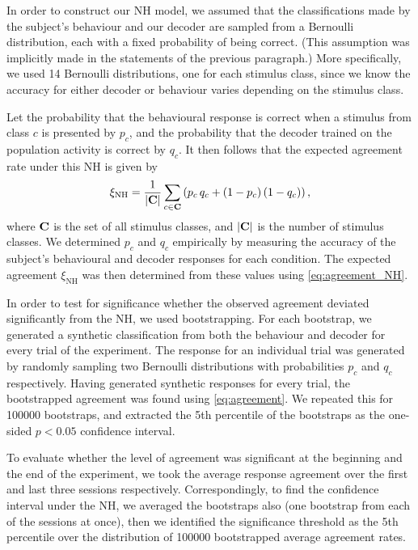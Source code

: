 In order to construct our \ac{NH} model, we assumed that the classifications made by the subject's behaviour and our decoder are sampled from a Bernoulli distribution, each with a fixed probability of being correct.
(This assumption was implicitly made in the statements of the previous paragraph.)
More specifically, we used \num{14} Bernoulli distributions, one for each stimulus class, since we know the accuracy for either decoder or behaviour varies depending on the stimulus class.

Let the probability that the behavioural response is correct when a stimulus from class $c$ is presented by $p_c$, and the probability that the decoder trained on the population activity is correct by $q_c$.
It then follows that the expected agreement rate under this \acf{NH} is given by
\begin{equation}
\label{eq:agreement_NH}
\xi_\text{NH} = \frac{1}{|\mathbf{C}|} \sum_{c \in \mathbf{C}} \left( p_c \, q_c + (1 - p_c) \, (1 - q_c) \right)
,\end{equation}
where $\mathbf{C}$ is the set of all stimulus classes, and $|\mathbf{C}|$ is the number of stimulus classes.
We determined $p_c$ and $q_c$ empirically by measuring the accuracy of the subject's behavioural and decoder responses for each condition.
The expected agreement $\xi_\text{NH}$ was then determined from these values using \autoref{eq:agreement_NH}.

In order to test for significance whether the observed agreement deviated significantly from the \ac{NH}, we used bootstrapping.
For each bootstrap, we generated a synthetic classification from both the behaviour and decoder for every trial of the experiment.
The response for an individual trial was generated by randomly sampling two Bernoulli distributions with probabilities $p_c$ and $q_c$ respectively.
Having generated synthetic responses for every trial, the bootstrapped agreement was found using \autoref{eq:agreement}.
We repeated this for \num{100000} bootstraps, and extracted the 5th percentile of the bootstraps as the one-sided $p < 0.05$ confidence interval.

To evaluate whether the level of agreement was significant at the beginning and the end of the experiment, we took the average response agreement over the first and last three sessions respectively. 
Correspondingly, to find the confidence interval under the \ac{NH}, we averaged the bootstraps also (one bootstrap from each of the sessions at once), then we identified the significance threshold as the 5th percentile over the distribution of \num{100000} bootstrapped average agreement rates.


